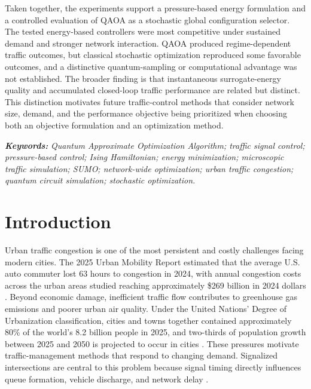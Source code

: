 Taken together, the experiments support a pressure-based energy formulation and a controlled evaluation of QAOA as a stochastic global configuration selector. The tested energy-based controllers were most competitive under sustained demand and stronger network interaction. QAOA produced regime-dependent traffic outcomes, but classical stochastic optimization reproduced some favorable outcomes, and a distinctive quantum-sampling or computational advantage was not established. The broader finding is that instantaneous surrogate-energy quality and accumulated closed-loop traffic performance are related but distinct. This distinction motivates future traffic-control methods that consider network size, demand, and the performance objective being prioritized when choosing both an objective formulation and an optimization method.

\textbf{\textit{Keywords:}} \textit{Quantum Approximate Optimization Algorithm; traffic signal control; pressure-based control; Ising Hamiltonian; energy minimization; microscopic traffic simulation; SUMO; network-wide optimization; urban traffic congestion; quantum circuit simulation; stochastic optimization.}

\section{Introduction}

Urban traffic congestion is one of the most persistent and costly challenges facing modern cities. The 2025 Urban Mobility Report estimated that the average U.S. auto commuter lost 63 hours to congestion in 2024, with annual congestion costs across the urban areas studied reaching approximately \$269 billion in 2024 dollars \cite{schrank2025}. Beyond economic damage, inefficient traffic flow contributes to greenhouse gas emissions and poorer urban air quality. Under the United Nations' Degree of Urbanization classification, cities and towns together contained approximately 80\% of the world's 8.2 billion people in 2025, and two-thirds of population growth between 2025 and 2050 is projected to occur in cities \cite{un2025}. These pressures motivate traffic-management methods that respond to changing demand. Signalized intersections are central to this problem because signal timing directly influences queue formation, vehicle discharge, and network delay \cite{varaiya2013}.


